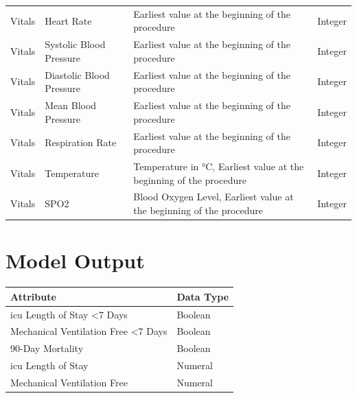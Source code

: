 \documentclass[conference,comsoc]{IEEEtran}
\begin{document}
\begin{longtable}[c]{C{0.2\textwidth} | C{0.2\textwidth} | C{0.4\textwidth} | C{0.2\textwidth}}
Vitals & Heart Rate & Earliest value at the beginning of the procedure & Integer \\
Vitals & Systolic Blood Pressure & Earliest value at the beginning of the procedure & Integer \\
Vitals & Diastolic Blood Pressure & Earliest value at the beginning of the procedure & Integer \\
Vitals & Mean Blood Pressure & Earliest value at the beginning of the procedure & Integer \\
Vitals & Respiration Rate & Earliest value at the beginning of the procedure & Integer \\
Vitals & Temperature & Temperature in °C, Earliest value at the beginning of the procedure & Integer \\
Vitals & SPO2 & Blood Oxygen Level, Earliest value at the beginning of the procedure & Integer \\
\end{longtable}

\section{Model Output}
\label{app:output}


\begin{longtable}[c]{C{0.5\textwidth} | C{0.5\textwidth}}

\textbf{Attribute} & \textbf{Data Type} \\
\midrule
\gls{icu} Length of Stay \textless 7 Days & Boolean \\
Mechanical Ventilation Free \textless 7 Days & Boolean \\ 
90-Day Mortality & Boolean \\
\gls{icu} Length of Stay & Numeral \\
Mechanical Ventilation Free & Numeral \\
\end{longtable}
\end{document}
